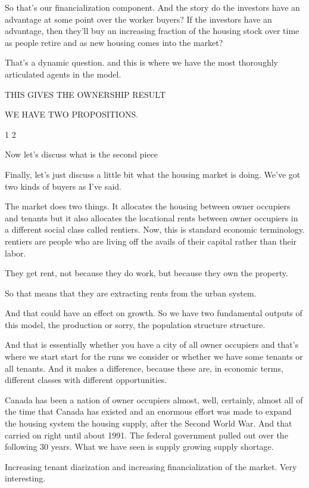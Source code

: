 \documentclass[]{article}
\begin{document}
So that's our financialization component. And the  story %
do the investors have an advantage at some point over the worker buyers? If the investors have an advantage, then they'll buy an increasing fraction of the housing stock over time as people retire and as new housing comes into the market?

That's a dynamic question.%
and this is where we have the most thoroughly articulated agents in the model.

THIS GIVES THE OWNERSHIP RESULT

WE HAVE TWO PROPOSITIONS.

1
2

Now let's discuss what is the second piece

Finally, let's just discuss a little bit what the housing market is doing. We've got two kinds of buyers as I've said.

The market does two things. It allocates the housing between owner occupiers and tenants but it also allocates the locational rents between owner occupiers in a different social class called rentiers. Now, this is standard economic terminology. rentiers are people who are living off the avails of their capital rather than their labor.

They get rent, not because they do work, but because they own the property.

So that means that they are extracting rents from the urban system.

And that could have an effect on growth. So we have two fundamental outputs of this model, the production or sorry, the population structure structure.

And that is essentially whether you have a city of all owner occupiers and that's where we start start for the runs we consider or whether we have some tenants or all tenants. And it makes a difference, because these are, in economic terms, different classes with different opportunities.

Canada has been a nation of owner occupiers almost, well, certainly, almost all of the time that Canada has existed and an enormous effort was made to expand the housing system the housing supply, after the Second World War. And that carried on right until about 1991. The federal government pulled out over the following 30 years. What we have seen is supply growing supply shortage.

Increasing tenant diarization and increasing financialization of the market. Very interesting.
\end{document}
